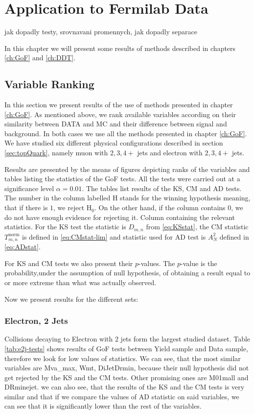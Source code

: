 \chapter{Application to Fermilab Data}
jak dopadly testy, srovnavani promennych, jak dopadly separace

\noindent In this chapter we will present some results of methods described in chapters \ref{ch:GoF} and \ref{ch:DDT}. 

\section{Variable Ranking}
In this section we present results  of the use of methods presented in chapter \ref{ch:GoF}. As mentioned above, we rank available variables according on their similarity between DATA and MC and their difference between signal and background. In both cases we use all the methods presented in chapter \ref{ch:GoF}. We have studied six different physical configurations described in section \ref{sec:topQuark}, namely muon with $2, 3, 4+$ jets and electron with $2, 3, 4+$ jets. 

Results are presented by the means of figures depicting ranks of the variables and tables listing the statistics of the GoF tests. All the tests were carried out at a significance level $\alpha = 0.01.$ The tables list results of the KS, CM and AD tests. The number in the column labelled H stands for the winning hypothesis meaning, that if there is $1$, we reject $\mathrm{H}_0$. On the other hand, if the column contains $0$, we do not have enough evidence for rejecting it. Column containing the relevant statistics. For the KS test the statistic is $D_{m,n}$ from \eqref{eq:KSstat}, the CM statistic $T^{\mathrm{norm}}_{m,n}$ is defined in \eqref{eq:CMstat-lim} and statistic used for AD test is $A_N^2$ defined in \eqref{eq:ADstat}. 

For KS and CM tests we also present their $p$-values. The $p$-value is the probability,under the assumption of null hypothesis, of obtaining a result equal to or more extreme than what was actually observed. 

Now we present results for the different sets:

\subsection{Electron, 2 Jets}
Collisions decaying to Electron with 2 jets form the largest studied dataset. Table \ref{tab:e2j-tests} shows results of GoF tests between Yield sample and Data sample, therefore we look for low values of statistics. We can see, that the most similar variables are \textsf{Mva\_max, Wmt, DiJetDrmin}, because their null hypothesis did not   get rejected by the KS and the CM tests. Other promising ones are \textsf{M01mall and DRminejet}. we can also see, that the results of the KS and the CM tests is very similar and that if we compare the values of AD statistic on said variables, we can see that it is significantly lower than the rest of the  variables. 

